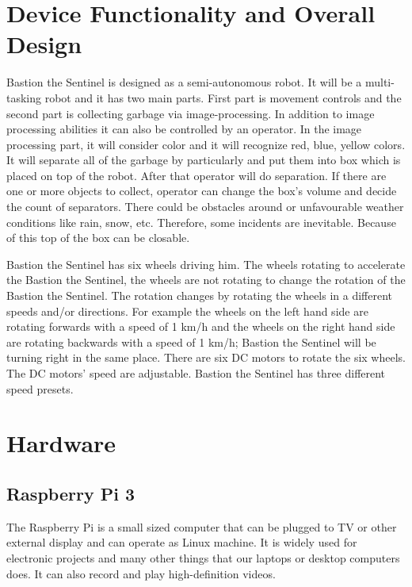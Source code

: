 \documentclass[12pt,a4paper]{article}
\begin{document}
\section{Device Functionality and Overall Design}
Bastion the Sentinel is designed as a semi-autonomous robot. It will be a multi-tasking robot and it has two main parts. 
First part is movement controls and the second part is collecting garbage via image-processing. In addition to image processing 
abilities it can also be controlled by an operator. In the image processing part, it will consider color and it will recognize 
red, blue, yellow colors. It will separate all of the garbage by particularly and put them into box which is placed on top of 
the robot. After that operator will do separation. If there are one or more objects to collect, operator can change the box’s 
volume and decide the count of separators. There could be obstacles around or unfavourable weather conditions like rain, snow, 
etc. Therefore, some incidents are inevitable. Because of this top of the box can be closable.

Bastion the Sentinel has six wheels driving him. The wheels rotating to accelerate the Bastion the Sentinel, the wheels 
are not rotating to change the rotation of the Bastion the Sentinel. The rotation changes by rotating the wheels in a 
different speeds and/or directions. For example the wheels on the left hand side are rotating forwards with a speed of 
1 km/h and the wheels on the right hand side are rotating backwards with a speed of 1 km/h; Bastion the Sentinel will 
be turning right in the same place. 
There are six DC motors to rotate the six wheels. The DC motors’ speed are adjustable. Bastion the Sentinel has three different speed presets. 

\section{Hardware}
\subsection{Raspberry Pi 3}
The Raspberry Pi is a small sized computer that can be plugged to TV or other external display and can operate as Linux machine. 
It is widely used for electronic projects and many other things that our laptops or desktop computers does. It can also record and 
play high-definition videos.
\end{document}
